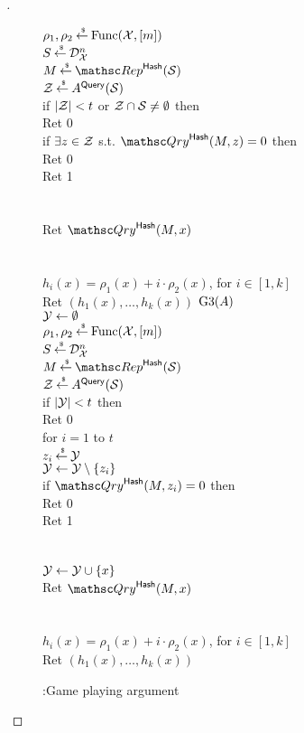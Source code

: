 \begin{proof}[]
\begin{figure}
{{$\rho_1,\rho_2 {\:\stackrel{{\scriptscriptstyle \hspace{0.2em}\$}} {\leftarrow}\:} \mathrm{Func}({\cal X},[m])$\\
$S {\:\stackrel{{\scriptscriptstyle \hspace{0.2em}\$}} {\leftarrow}\:} \mathcal{D}_{{\cal X}}^{n}$\\
$M \getsr \Rep^{\HashOracle}(\calS)$\\
${\cal Z} {\:\stackrel{{\scriptscriptstyle \hspace{0.2em}\$}} {\leftarrow}\:} A^{\mathsf{Query}}({\cal S})$\\
if $|{\cal Z}| < t$ or ${\cal Z} \cap {\cal S} \neq \emptyset$ then \\
\nudge Ret 0\\
if $\exists z \in {\cal Z}$ s.t. $\Qry^{\HashOracle}(M,z)=0$ then\\
\nudge Ret 0\\
Ret 1\\\\
%
\\
Ret $\Qry^{\HashOracle}(M,x)$\\\\
%
\\
$h_i(x) = \rho_1(x)+i \cdot \rho_2(x)$, for $i\in[1,k]$\\
Ret $\left(h_1(x),\ldots,h_k(x)\right)$
}
{
\underline{$\text{G3}(A)$}\\
${\cal Y} \gets \emptyset $\\
$\rho_1,\rho_2 {\:\stackrel{{\scriptscriptstyle \hspace{0.2em}\$}} {\leftarrow}\:} \mathrm{Func}({\cal X},[m])$\\
$S {\:\stackrel{{\scriptscriptstyle \hspace{0.2em}\$}} {\leftarrow}\:} \mathcal{D}_{{\cal X}}^{n}$\\
$M \getsr \Rep^{\HashOracle}(\calS)$\\
${\cal Z} {\:\stackrel{{\scriptscriptstyle \hspace{0.2em}\$}} {\leftarrow}\:} A^{\mathsf{Query}}({\cal S})$\\
if $|{\cal Y}| < t$ then \\ 
\nudge Ret 0\\
for $i=1$ to $t$ \\
\nudge $z_i {\:\stackrel{{\scriptscriptstyle \hspace{0.2em}\$}} {\leftarrow}\:} {\cal Y} $\\
\nudge ${\cal Y} \gets {\cal Y} \setminus \{z_i\}$\\
\nudge if $\Qry^{\HashOracle}(M,z_i)=0$ then\\
\nudge \nudge Ret 0\\
Ret 1\\\\
%
\\
${\cal Y} \gets {\cal Y} \cup \{x\}$\\
Ret $\Qry^{\HashOracle}(M,x)$\\\\
%
\\
$h_i(x) = \rho_1(x)+i \cdot \rho_2(x)$, for $i\in[1,k]$\\
Ret $\left(h_1(x),\ldots,h_k(x)\right)$
}
}
\caption{:Game playing argument}\label{fig:Game}
\end{figure}


\end{proof}
